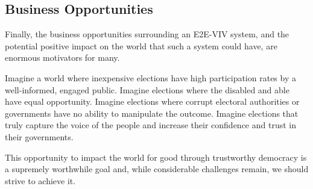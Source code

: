 \subsection{Business Opportunities}

Finally, the business opportunities surrounding an E2E-VIV
system, and the potential positive impact on the world that such a
system could have, are enormous motivators for many.

Imagine a world where inexpensive elections have high participation
rates by a well-informed, engaged public. Imagine elections where the
disabled and able have equal opportunity. Imagine elections where
corrupt electoral authorities or governments have no ability to
manipulate the outcome. Imagine elections that truly capture the voice
of the people and increase their confidence and trust in their
governments.

This opportunity to impact the world for good through trustworthy
democracy is a supremely worthwhile goal and, while considerable
challenges remain, we should strive to achieve it.
